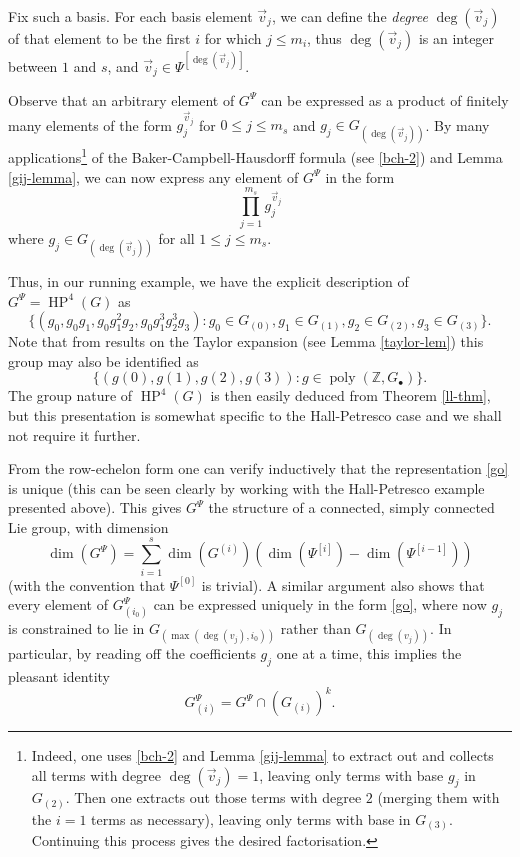 \documentclass[11pt,reqno]{amsart}
\numberwithin{equation}{section}
\theoremstyle{plain}
\theoremstyle{definition}
\renewcommand{\leq}{\leqslant}
\newcommand\Z{\mathbb{Z}}
\newcommand\1{{\bf 1}}
\newcommand\2{{\bf 2}}
\newcommand\HP{\operatorname{HP}}
\newcommand\poly{\operatorname{poly}}
\renewcommand\deg{\operatorname{deg}}
\begin{document}
Fix such a basis.  For each basis element $\vec{v}_j$, we can define the \emph{degree} $\deg(\vec{v}_j)$ of that element to be the first $i$ for which $j \leq m_i$, thus $\deg(\vec{v}_j)$ is an integer between $1$ and $s$, and $\vec{v}_j \in \Psi^{[\deg(\vec{v}_j)]}$.

Observe that an arbitrary element of $G^\Psi$ can be expressed as a product of finitely many elements of the form $g_j^{\vec v_j}$ for $0 \leq j \leq m_s$ and $g_j \in G_{(\deg(\vec{v}_j))}$.
By many applications\footnote{Indeed, one uses \eqref{bch-2} and Lemma \ref{gij-lemma} to extract out and collects all terms with degree $\deg(\vec{v}_j)= 1$, leaving only terms with base $g_j$ in $G_{(2)}$.  Then one extracts out those terms with degree $2$ (merging them with the $i=1$ terms as necessary), leaving only terms with base in $G_{(3)}$.  Continuing this process gives the desired factorisation.}
of the Baker-Campbell-Hausdorff formula (see \eqref{bch-2}) and Lemma \ref{gij-lemma}, we can now express any element of $G^{\Psi}$ in the form
\begin{equation}\label{go}
\prod_{j=1}^{m_s} g_j^{\vec{v}_j}
\end{equation}
where $g_j \in G_{(\deg(\vec{v}_j))}$ for all $1 \leq j \leq m_s$.

Thus, in our running example, we have the explicit description of $G^{\Psi} = \HP^4(G)$ as
\[ \{ (g_0, g_0 g_1, g_0 g_1^2 g_2, g_0 g_1^3 g_2^3 g_3) : g_0 \in G_{(0)}, g_1 \in G_{(1)}, g_2 \in G_{(2)}, g_3 \in G_{(3)}\}.\]
Note that from results on the Taylor expansion (see Lemma \ref{taylor-lem}) this group may also be identified as
\[ \{ (g(0), g(1), g(2), g(3)) : g \in \poly(\Z,G_{\bullet})\}.\]
The group nature of $\HP^4(G)$ is then easily deduced from Theorem \ref{ll-thm}, but this presentation is somewhat specific to the Hall-Petresco case and we shall not require it further.

From the row-echelon form one can verify inductively that the representation \eqref{go} is unique (this can be seen clearly by working with the Hall-Petresco example presented above). This gives $G^{\Psi}$ the structure of a connected, simply connected Lie group, with dimension
\begin{equation}\label{dimgo}
\dim(G^\Psi) = \sum_{i=1}^s \dim(G^{(i)}) (\dim(\Psi^{[i]}) - \dim(\Psi^{[i-1]})) 
\end{equation}
(with the convention that $\Psi^{[0]}$ is trivial).  A similar argument also shows that every element of $G^{\Psi}_{(i_0)}$ can be expressed uniquely in the form \eqref{go}, where now $g_j$ is constrained to lie in $G_{(\max(\deg(v_j),i_0))}$ rather than $G_{(\deg(v_j))}$.   In particular, by reading off the coefficients $g_{j}$ one at a time, this implies the pleasant identity
\begin{equation}\label{pleasant}
G^{\Psi}_{(i)} = G^{\Psi} \cap (G_{(i)})^k.
\end{equation}
\end{document}

